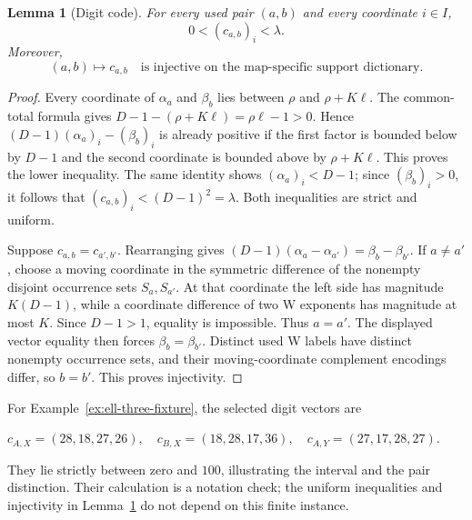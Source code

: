 \documentclass[11pt,letterpaper]{article}
\newtheorem{lemma}[theorem]{Lemma}
\theoremstyle{definition}
\theoremstyle{remark}
\numberwithin{equation}{section}
\begin{document}
\begin{lemma}[Digit code]
\label{lem:digit-code}
For every used pair \((a,b)\) and every coordinate \(i\in I\),
\begin{equation}
 0<(c_{a,b})_i<\lambda.
 \label{eq:digit-bounds}
\end{equation}
Moreover,
\begin{equation}
 (a,b)\longmapsto c_{a,b}
 \quad\text{is injective on the map-specific support dictionary.}
 \label{eq:pair-injectivity}
\end{equation}
\end{lemma}

\begin{proof}
Every coordinate of \(\alpha_a\) and \(\beta_b\) lies between \(\rho\)
and \(\rho+K\ell\).  The common-total formula gives
\(D-1-(\rho+K\ell)=\rho\ell-1>0\).  Hence
\((D-1)(\alpha_a)_i-(\beta_b)_i\) is already positive if the first factor
is bounded below by \(D-1\) and the second coordinate is bounded above by
\(\rho+K\ell\).  This proves the lower inequality.  The same identity shows
\((\alpha_a)_i<D-1\); since \((\beta_b)_i>0\), it follows that
\((c_{a,b})_i<(D-1)^2=\lambda\).  Both inequalities are strict and uniform.

Suppose \(c_{a,b}=c_{a',b'}\).  Rearranging gives
\((D-1)(\alpha_a-\alpha_{a'})=\beta_b-\beta_{b'}\).  If \(a\neq a'\),
choose a moving coordinate in the symmetric difference of the nonempty
disjoint occurrence sets \(S_a,S_{a'}\).  At that coordinate the left side
has magnitude \(K(D-1)\), while a coordinate difference of two W exponents
has magnitude at most \(K\).  Since \(D-1>1\), equality is impossible.
Thus \(a=a'\).  The displayed vector equality then forces
\(\beta_b=\beta_{b'}\).  Distinct used W labels have distinct nonempty
occurrence sets, and their moving-coordinate complement encodings differ, so
\(b=b'\).  This proves injectivity.
\end{proof}

For Example~\ref{ex:ell-three-fixture}, the selected digit vectors are

\begin{center}
\(c_{A,X}=(28,18,27,26),\quad c_{B,X}=(18,28,17,36),\quad
c_{A,Y}=(27,17,28,27).\)
\end{center}

They lie strictly between zero and \(100\), illustrating the interval and
the pair distinction.  Their calculation is a notation check; the uniform
inequalities and injectivity in Lemma~\ref{lem:digit-code} do not depend on
this finite instance.
\end{document}
